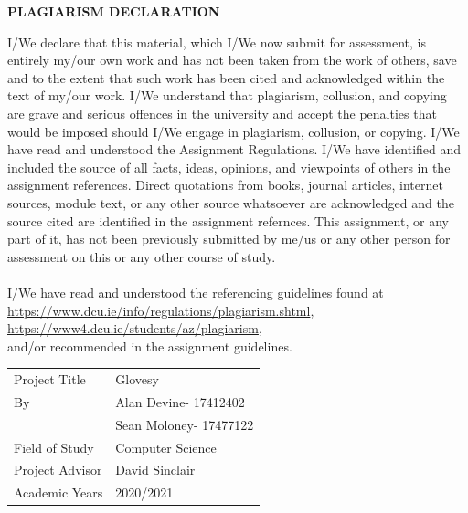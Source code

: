 \documentclass[12pt,a4paper,oneside]{book}
\theoremstyle{plain}
\numberwithin{equation}{chapter}
\begin{document}
\newpage
{}
\begin{center}
    \large\textbf{PLAGIARISM DECLARATION}
\end{center}
\noindent I/We declare that this material, which I/We now submit for assessment, is entirely my/our own work and has not been taken from the work of others, save and to the extent that such work has been cited and acknowledged within the text of my/our work. I/We understand that plagiarism, collusion, and copying are grave and serious offences in the university and accept the penalties that would be imposed should I/We engage in plagiarism, collusion, or copying. I/We have read and understood the Assignment Regulations. I/We have identified and included the source of all facts, ideas, opinions, and viewpoints of others in the assignment references. Direct quotations from books, journal articles, internet sources, module text, or any other source whatsoever are acknowledged and the source cited are identified in the assignment refernces. This assignment, or any part of it, has not been previously submitted by me/us or any other person for assessment on this or any other course of study. \\
\\
I/We have read and understood the referencing guidelines found at \\
\url{https://www.dcu.ie/info/regulations/plagiarism.shtml}, \\
\url{https://www4.dcu.ie/students/az/plagiarism}, \\
and/or recommended in the assignment guidelines.

\begin{table}[h]
	\begin{tabular}{ll}
        Project Title       & Glovesy  \\
        By                  & Alan Devine\hspace{5mm}- 17412402\\
                            & Sean Moloney\hspace{2mm}- 17477122\\
        Field of Study      & Computer Science \\
        Project Advisor	    & David Sinclair \\
        Academic Years      & 2020/2021 \\
	\end{tabular}
\end{table}
\end{document}

